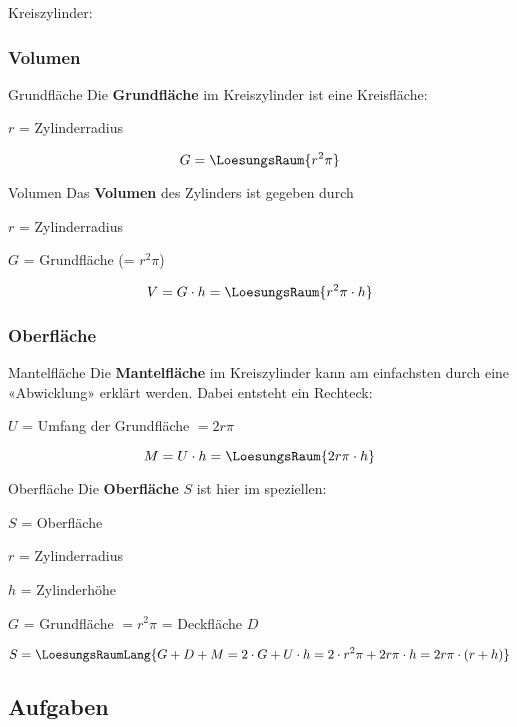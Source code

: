 Kreiszylinder: 


\subsubsection{Volumen}

\begin{bemerkung}{Grundfläche}{}
  Die \textbf{Grundfläche} im Kreiszylinder ist eine Kreisfläche:

  $r$ = Zylinderradius
  
  $$G = \LoesungsRaum{r^2\pi}$$
\end{bemerkung}

\begin{gesetz}{Volumen}{}
  Das \textbf{Volumen} des Zylinders ist gegeben durch

  $r$ = Zylinderradius

  $G$ = Grundfläche (= $r^2\pi$)

  $$V = G\cdot{}h = \LoesungsRaum{r^2\pi\cdot{} h}$$
\end{gesetz}
\newpage

\subsubsection{Oberfläche}




\begin{bemerkung}{Mantelfläche}{}
  Die \textbf{Mantelfläche} im Kreiszylinder kann am einfachsten durch eine «Abwicklung» erklärt werden. Dabei entsteht ein Rechteck:

  $U$ = Umfang der Grundfläche $= 2r\pi$
  
  $$M = U\cdot{}h = \LoesungsRaum{2r\pi\cdot{}h}$$
\end{bemerkung}


\begin{gesetz}{Oberfläche}{}
  Die \textbf{Oberfläche} $S$ ist hier im speziellen:

  $S$ = Oberfläche

  $r$ = Zylinderradius

  $h$ = Zylinderhöhe

  $G$ = Grundfläche $=r^2\pi$ = Deckfläche $D$

  $$S =\LoesungsRaumLang{G+D+M = 2\cdot{}G + U\cdot{}h = 2\cdot{}r^2\pi + 2r\pi\cdot{}h = 2r\pi\cdot{}(r + h)}$$
\end{gesetz}


\newpage

\subsection*{Aufgaben}

\newpage
